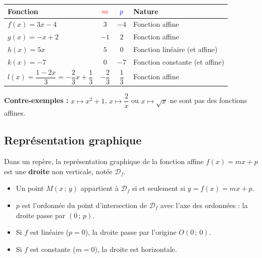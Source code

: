 \begin{ex}
	\nline
	\begin{center}
		\def\arraystretch{1.5}
		\begin{tabular}{|l|c|c|l|} \hline
			\textbf{Fonction}                                                                & $\textcolor{red}{m}$ & $\textcolor{blue}{p}$ & \textbf{Nature}                \\ \hline
			$f(x) = 3x - 4$                                                                  & $3$                  & $-4$                  & Fonction affine                \\ \hline
			$g(x) = -x + 2$                                                                  & $-1$                 & $2$                   & Fonction affine                \\ \hline
			$h(x) = 5x$                                                                      & $5$                  & $0$                   & Fonction linéaire (et affine)  \\ \hline
			$k(x) = -7$                                                                      & $0$                  & $-7$                  & Fonction constante (et affine) \\ \hline
			\rule[-5mm]{0mm}{13mm}$l(x) = \dfrac{1 - 2x}{3} = -\dfrac{2}{3}x + \dfrac{1}{3}$ & $-\dfrac{2}{3}$      & $\dfrac{1}{3}$        & Fonction affine                \\ \hline
		\end{tabular}
	\end{center}
\end{ex}

\begin{rem}
	\textbf{Contre-exemples :} $x \mapsto x^2 + 1$, $x \mapsto \dfrac{2}{x}$ ou $x \mapsto \sqrt{x}$ ne sont pas des fonctions affines.
\end{rem}

\subsection{Représentation graphique}

\begin{prop}{}
	Dans un repère, la représentation graphique de la fonction affine $f(x) = mx + p$ est une \textbf{droite} non verticale, notée $\mathcal{D}_f$.
	\begin{itemize}
		\item Un point $M(x\,;\,y)$ appartient à $\mathcal{D}_f$ si et seulement si $y = f(x) = mx + p$.
		\item $p$ est l'ordonnée du point d'intersection de $\mathcal{D}_f$ avec l'axe des ordonnées : la droite passe par $(0\,;\,p)$.
		\item Si $f$ est linéaire ($p = 0$), la droite passe par l'origine $O(0\,;\,0)$.
		\item Si $f$ est constante ($m = 0$), la droite est horizontale.
	\end{itemize}
\end{prop}

